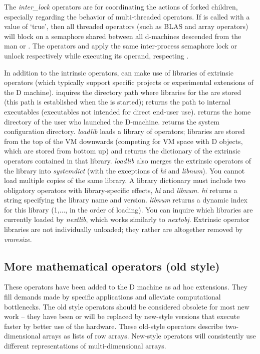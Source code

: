 The \emph{inter\_lock} operators are for coordinating the actions of
forked children, especially regarding the behavior of multi-threaded
operators. If  is called with a value of `true',
then all threaded operators (such as BLAS and array operators) will
block on a semaphore shared between all d-machines descended from the
man  or . The operators  and
apply the same inter-process semaphore lock or unlock
respectively while executing its operand, respecting
.

In addition to the intrinsic operators,  can make
use of libraries of extrinsic operators (which typically support
specific projects or experimental extensions of the D
machine).  inquires the directory path where
libraries for the  are stored (this path is established
when the  is started);  returns the path
to internal executables (executables not intended for direct end-user
use).  returns the home directory of the user who
launched the D-machine.  returns the system
configuration directory. \emph{loadlib} loads a library of operators;
libraries are stored from the top of the VM downwards (competing for
VM space with D objects, which are stored from bottom up) and returns
the dictionary of the extrinsic operators contained in that
library. \emph{loadlib} also merges the extrinsic operators of the
library into \emph{systemdict} (with the exceptions of \emph{hi} and
\emph{libnum}). You cannot load multiple copies of the same library. A
library dictionary must include two obligatory operators with
library-specific effects, \emph{hi} and \emph{libnum}. \emph{hi}
returns a string specifying the library name and
version. \emph{libnum} returns a dynamic index for this library
(1,..., in the order of loading). You can inquire which libraries are
currently loaded by \emph{nextlib}, which works similarly to
\emph{nextobj}. Extrinsic operator libraries are not individually
unloaded; they rather are altogether removed by \emph{vmresize}.


\subsection{More mathematical operators (old style)}\label{ssec:oldstyle}

These operators have been added to the D machine as ad hoc extensions. They fill demands made by specific applications and alleviate computational bottlenecks. The old style operators should be considered obsolete for most new work -- they have been or will be replaced by new-style versions that execute faster by better use of the hardware. These old-style operators describe two-dimensional arrays as lists of row arrays. New-style operators will consistently use different representations of multi-dimensional arrays.\\



